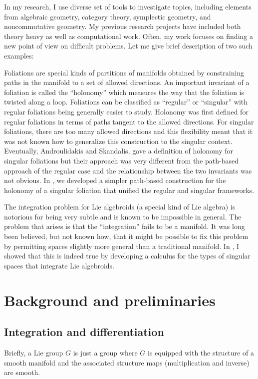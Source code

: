 \documentclass[11pt, letterpaper]{article}
\begin{document}
In my research, I use diverse set of tools to investigate topics, including elements from algebraic geometry, category theory, symplectic geometry, and noncommutative geometry. My previous research projects have included both theory heavy \cite{MyThesis} as well as computational work\cite{Bpicpoiss}. Often, my work focuses on finding a new point of view on difficult problems. Let me give brief description of two such examples: 

Foliations are special kinds of partitions of manifolds obtained by constraining paths in the manifold to a set of allowed directions. An important invariant of a foliation is called the ``holonomy'' which measures the way that the foliation is twisted along a loop. Foliations can be classified as ``regular'' or ``singular'' with regular foliations being generally easier to study. Holonomy was first defined for regular foliations in terms of paths tangent to the allowed directions. For singular foliations, there are too many allowed directions and this flexibility meant that it was not known how to generalize this construction to the singular context. Eventually, Androulidakis and Skandalis\cite{AS.Holonomy},  gave a definition of holonomy for singular foliations but their approach was very different from the path-based approach of the regular case and the relationship between the two invariants was not obvious. In \cite{villatoro2019integration}, we developed a simpler path-based construction for the holonomy of a singular foliation that unified the regular and singular frameworks. 

The integration problem for Lie algebroids (a special kind of Lie algebra) is notorious for being very subtle and is known to be impossible in general\cite{almeida_suites_1985}. The problem that arises is that the ``integration'' fails to be a manifold. It was long been believed, but not known how, that it might be possible to fix this problem by permitting spaces slightly more general than a traditional manifold. In \cite{nonintegrable}, I showed that this is indeed true by developing a calculus for the types of singular spaces that integrate Lie algebroids.

\section{Background and preliminaries}

\subsection{Integration and differentiation}
Briefly, a Lie group \( G \) is just a group where \( G \) is equipped with the structure of a smooth manifold and the associated structure maps (multiplication and inverse) are smooth.
\end{document}
